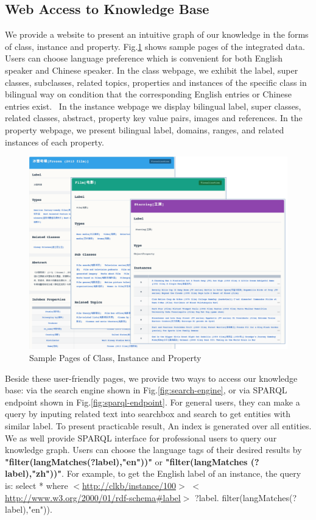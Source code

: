 \documentclass[runningheads,a4paper]{llncs}
\begin{document}
\begin{CJK*}{UTF8}{song}
\subsection{Web Access to Knowledge Base}
We provide a website to present an intuitive graph of our knowledge in the forms of class, instance and property. Fig.\ref{fig:xlore} shows sample pages of the integrated data. Users can choose language preference which is convenient for both English speaker and Chinese speaker. In the class webpage, we exhibit the label, super classes, subclasses, related topics, properties and instances of the specific class in bilingual way on condition that the corresponding English entries or Chinese entries exist.  In the instance webpage we display bilingual label, super classes, related classes, abstract, property key value pairs, images and references. In the property webpage, we present bilingual label, domains, ranges, and related instances of each property.
\begin{figure}[ht]
    \centerline{\includegraphics[width=1\columnwidth]{fig/xlore}}
    \caption{Sample Pages of Class, Instance and Property}
    \label{fig:xlore}
\end{figure}%
Beside these user-friendly pages, we provide two ways to access our knowledge base: via the search engine shown in Fig.\ref{fig:search-engine}, or via SPARQL endpoint shown in Fig.\ref{fig:sparql-endpoint}. For general users, they can make a query by inputing related text into searchbox and search to get entities with similar label. To present practicable result, An index is generated over all entities. We as well provide SPARQL interface for professional users to query our knowledge graph. Users can choose the language tags of their desired results by \textbf{"filter(langMatches(?label),"en"))"} or \textbf{"filter(langMatches (?label),"zh"))"}. For example, to get the English label of an instance, the query is: select * where {$<$\url{http://clkb/instance/100}$>$ $<$\url{http://www.w3.org/2000/01/rdf-schema#label}$>$ ?label. filter(langMatches(?label),"en"))}.


\end{CJK*}
\end{document}
